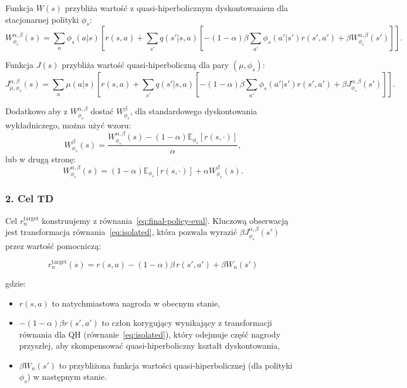 Funkcja $W(s)$ przybliża wartość z quasi-hiperbolicznym dyskontowaniem dla stacjonarnej polityki $\phi_s$:
\begin{equation}
W^{\alpha,\beta}_{\phi_s}(s) = \sum_a \phi_s(a|s) \left[ r(s,a) + \sum_{s'} q(s'|s,a) \left[ -(1-\alpha)\beta \sum_{a'} \phi_s(a'|s') r(s',a') + \beta W^{\alpha,\beta}_{\phi_s}(s') \right] \right].
\label{eq:W-qh-stationary}
\end{equation}

Funkcja $J(s)$ przybliża wartość quasi-hiperboliczną dla pary $(\mu, \phi_s)$:
\begin{equation}
J^{\alpha,\beta}_{\mu,\phi_s}(s) = \sum_a \mu(a|s) \left[ r(s,a) + \sum_{s'} q(s'|s,a) \left[ -(1-\alpha)\beta \sum_{a'} \phi_s(a'|s') r(s',a') + \beta J^{\alpha,\beta}_{\phi_s}(s') \right] \right].
\label{eq:J-qh-pair}
\end{equation}

Dodatkowo aby z $W^{\alpha,\beta}_{\phi_s}$ dostać $W^{\beta}_{\phi_s}$, dla standardowego dyskontowania wykładniczego, można użyć wzoru:
\begin{equation}
W^{\beta}_{\phi_s}(s) = \frac{W^{\alpha,\beta}_{\phi_s}(s) - (1-\alpha)\mathbb{E}_{\phi_s}[r(s,\cdot)]}{\alpha},
\label{eq: get Wexp from Wqh}
\end{equation}
lub w drugą stronę:
\begin{equation}
W^{\alpha,\beta}_{\phi_s}(s) = (1-\alpha)\mathbb{E}_{\phi_s}[r(s,\cdot)] + \alpha W^{\beta}_{\phi_s}(s).
\label{eq: get Wqh from Wexp}
\end{equation}
\subsubsection*{2. Cel TD}

Cel $r_n^{\text{target}}$ konstruujemy z równania~\eqref{eq:final-policy-eval}. Kluczową obserwacją jest transformacja równania~\eqref{eq:isolated}, która pozwala wyrazić $\beta J^{\alpha,\beta}_{\phi_s}(s')$ przez wartość pomocniczą:

\begin{equation}
    r_n^{\text{target}}(s) = r(s,a) - (1-\alpha)\beta \, r(s',a') + \beta W_n(s')
    \label{eq:td_target}
\end{equation}

\noindent gdzie:
\begin{itemize}
    \item $r(s,a)$ to natychmiastowa nagroda w obecnym stanie,
    \item $-(1-\alpha)\beta r(s',a')$ to człon korygujący wynikający z transformacji równania dla QH (równanie~\eqref{eq:isolated}), który odejmuje część nagrody przyszłej, aby skompensować quasi-hiperboliczny kształt dyskontowania,
    \item $\beta W_n(s')$ to przybliżona funkcja wartości quasi-hiperbolicznej (dla polityki $\phi_s$) w następnym stanie.
\end{itemize}

